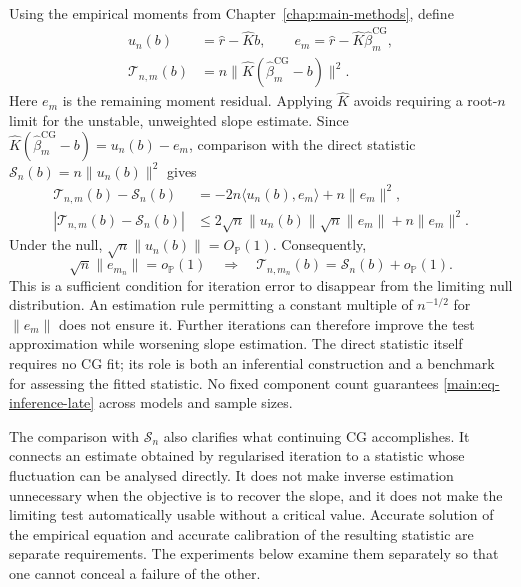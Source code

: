 Using the empirical moments from Chapter~\ref{chap:main-methods}, define
\begin{equation}
 \begin{aligned}
 u_n(b)&=\widehat r-\widehat Kb,\qquad
 e_m=\widehat r-\widehat K\widehat\beta_m^{\mathrm{CG}},\\
 \mathcal T_{n,m}(b)&=n\|\widehat K(\widehat\beta_m^{\mathrm{CG}}-b)\|^2.
 \end{aligned}
 \label{main:eq-inference-statistic}
\end{equation}
Here $e_m$ is the remaining moment residual.  Applying $\widehat K$ avoids
requiring a root-$n$ limit for the unstable, unweighted slope estimate.
Since $\widehat K(\widehat\beta_m^{\mathrm{CG}}-b)=u_n(b)-e_m$, comparison
with the direct statistic $\mathcal S_n(b)=n\|u_n(b)\|^2$ gives
\begin{align}
 \mathcal T_{n,m}(b)-\mathcal S_n(b)
 &=-2n\langle u_n(b),e_m\rangle+n\|e_m\|^2,\label{main:eq-inference-difference}\\
 |\mathcal T_{n,m}(b)-\mathcal S_n(b)|
 &\leq2\sqrt n\|u_n(b)\|\sqrt n\|e_m\|+n\|e_m\|^2.\nonumber
\end{align}
Under the null, $\sqrt n\|u_n(b)\|=O_{\mathbb P}(1)$.  Consequently,
\begin{equation}
 \sqrt n\|e_{m_n}\|=o_{\mathbb P}(1)
 \quad\Longrightarrow\quad
 \mathcal T_{n,m_n}(b)=\mathcal S_n(b)+o_{\mathbb P}(1).
 \label{main:eq-inference-late}
\end{equation}
This is a sufficient condition for iteration error to disappear from the
limiting null distribution.  An estimation rule permitting a constant
multiple of $n^{-1/2}$ for $\|e_m\|$ does not ensure it.  Further iterations
can therefore improve the test approximation while worsening slope
estimation.  The direct statistic itself requires no CG fit; its role is
both an inferential construction and a benchmark for assessing the fitted
statistic.  No fixed component count guarantees
\eqref{main:eq-inference-late} across models and sample sizes.

The comparison with $\mathcal S_n$ also clarifies what continuing CG
accomplishes.  It connects an estimate obtained by regularised iteration
to a statistic whose fluctuation can be analysed directly.  It does not
make inverse estimation unnecessary when the objective is to recover the
slope, and it does not make the limiting test automatically usable without
a critical value.  Accurate solution of the empirical equation and accurate
calibration of the resulting statistic are separate requirements.  The
experiments below examine them separately so that one cannot conceal a
failure of the other.

